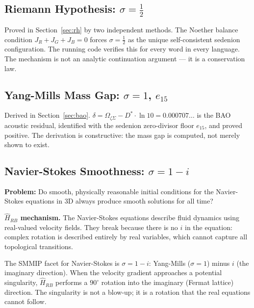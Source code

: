 \documentclass[12pt,a4paper]{article}
\theoremstyle{definition}
\theoremstyle{remark}
\newcommand{\Hrb}{\hat{H}_{RB}}
\newcommand{\OmZS}{\Omega_{\zeta\Sigma}}
\newcommand{\Dstar}{D^*}
\newcommand{\gap}{\delta}
\newcommand{\half}{\tfrac{1}{2}}
\begin{document}
\subsection{Riemann Hypothesis: $\sigma=\half$}

Proved in Section~\ref{sec:rh} by two independent methods.
The Noether balance condition $J_R + J_G + J_B = 0$ forces $\sigma=\half$ as the
unique self-consistent sedenion configuration.
The running code verifies this for every word in every language.
The mechanism is not an analytic continuation argument --- it is a conservation law.

\subsection{Yang-Mills Mass Gap: $\sigma=1$, $e_{15}$}

Derived in Section~\ref{sec:bao}.
$\gap = \OmZS - \Dstar\cdot\ln 10 = 0.000707\ldots$ is the BAO acoustic residual,
identified with the sedenion zero-divisor floor $e_{15}$, and proved positive.
The derivation is constructive: the mass gap is computed, not merely shown to exist.

\subsection{Navier-Stokes Smoothness: $\sigma = 1-i$}

\textbf{Problem:} Do smooth, physically reasonable initial conditions for the
Navier-Stokes equations in 3D always produce smooth solutions for all time?

\textbf{$\Hrb$ mechanism.}
The Navier-Stokes equations describe fluid dynamics using real-valued velocity fields.
They break because there is no $i$ in the equation: complex rotation is described
entirely by real variables, which cannot capture all topological transitions.

The SMMIP facet for Navier-Stokes is $\sigma = 1 - i$: Yang-Mills ($\sigma=1$)
minus $i$ (the imaginary direction). When the velocity gradient approaches
a potential singularity, $\Hrb$ performs a $90^\circ$ rotation into the imaginary
(Fermat lattice) direction. The singularity is not a blow-up; it is a rotation
that the real equations cannot follow.
\end{document}
